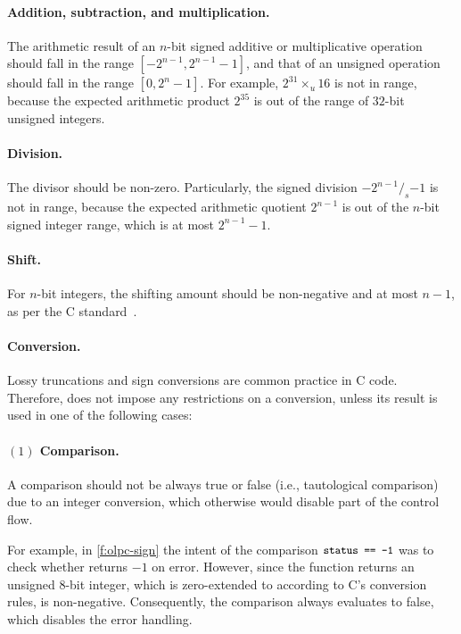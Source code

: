 \paragraph{Addition, subtraction, and multiplication.}
The arithmetic result of an $n$-bit signed additive or multiplicative
operation should fall in the range $[-2^{n-1}, 2^{n-1}-1]$,
and that of an unsigned operation should fall in the range
$[0, 2^{n}-1]$.
For example,
$2^{31}\times_u 16$ is not in range,
because the expected arithmetic product $2^{35}$ is out of the range
of $32$-bit unsigned integers.

\paragraph{Division.}
The divisor should be non-zero.  Particularly, the signed division
$-2^{n-1} /_s {-1}$ is not in range, because the expected arithmetic
quotient $2^{n-1}$ is out of the $n$-bit signed integer range,
which is at most $2^{n-1}-1$.

\paragraph{Shift.}
For $n$-bit integers, the shifting amount should be non-negative
and at most $n-1$, as per the C standard~\cite[6.5.7]{c11}.

\paragraph{Conversion.}
Lossy truncations and sign conversions are common practice in
C code.  Therefore,
\sys does not impose any restrictions on a conversion,
unless its result is used in one of the following cases:

\paragraph{$(1)$ Comparison.}
A comparison should not be always true or false (i.e., tautological
comparison) due to an integer conversion, which otherwise would
disable part of the control flow.

For example, in \autoref{f:olpc-sign} the intent of the comparison
$\cc{status == -1}$ was to check whether  returns
${-1}$ on error.  However, since the function returns an unsigned 8-bit
integer, which is zero-extended to  according to C's
conversion rules,  is non-negative.  Consequently,
the comparison always evaluates to false, which disables the error
handling.

